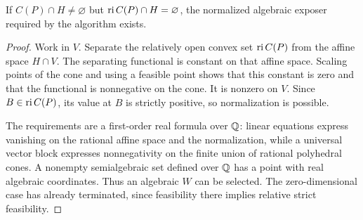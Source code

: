\begin{lemma}\label{lem:exposer}
If $C(P)\cap H\ne\varnothing$ but $\operatorname{ri} C(P)\cap H=\varnothing$, the normalized algebraic exposer required by the algorithm exists.
\end{lemma}
\begin{proof}
Work in $V$. Separate the relatively open convex set $\operatorname{ri} C(P)$ from the affine space $H\cap V$. The separating functional is constant on that affine space. Scaling points of the cone and using a feasible point shows that this constant is zero and that the functional is nonnegative on the cone. It is nonzero on $V$. Since $B\in\operatorname{ri} C(P)$, its value at $B$ is strictly positive, so normalization is possible.

The requirements are a first-order real formula over $\mathbb Q$: linear equations express vanishing on the rational affine space and the normalization, while a universal vector block expresses nonnegativity on the finite union of rational polyhedral cones. A nonempty semialgebraic set defined over $\mathbb Q$ has a point with real algebraic coordinates. Thus an algebraic $W$ can be selected. The zero-dimensional case has already terminated, since feasibility there implies relative strict feasibility.
\end{proof}

